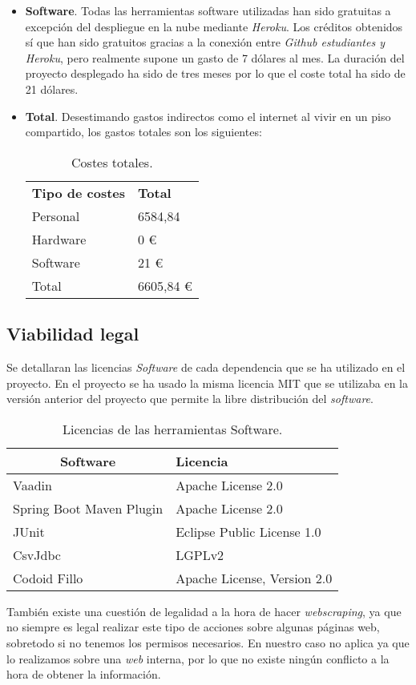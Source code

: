 \begin{itemize}
\item \textbf{Software}.
Todas las herramientas software utilizadas han sido gratuitas a excepción del despliegue en la nube mediante \emph{Heroku}. Los créditos obtenidos sí que han sido gratuitos gracias a la conexión entre \emph{Github estudiantes y Heroku}, pero realmente supone un gasto de 7 dólares al mes.
La duración del proyecto desplegado ha sido de tres meses por lo que el coste total ha sido de 21 dólares.

 
\item \textbf{Total}.
Desestimando gastos indirectos como el internet al vivir en un piso compartido, los gastos totales son los siguientes:

\begin{table}[]
	\label{Costes totales}
	\centering
	\begin{tabular}{|l|l|}
		\hline
		\multicolumn{1}{|c|}{\textbf{Tipo de costes}}     & \textbf{Total} \\
		Personal &  6584,84\\ 
		Hardware & 0 € \\
		Software & 21 € \\	\hline
		Total & 6605,84 € \\\hline
	\end{tabular}
	\caption{Costes totales.}
\end{table}

\end{itemize}

\subsection{Viabilidad legal}
Se detallaran las licencias \emph{Software} de cada dependencia que se ha utilizado en el proyecto. En el proyecto se ha usado la misma licencia MIT que se utilizaba en la versión anterior del proyecto que permite la libre distribución del \emph{software}.

\begin{table}[]
	\label{Dependencias del proyecto}
	\centering
	\begin{tabular}{|l|l|}
		\hline
		\multicolumn{1}{|c|}{\textbf{Software}}     & \textbf{Licencia} \\ \hline
		Vaadin & Apache License 2.0 \\ \hline
		Spring Boot Maven Plugin & Apache License 2.0 \\ \hline
		JUnit & Eclipse Public License 1.0 \\	\hline
		CsvJdbc & LGPLv2 \\ \hline
		Codoid Fillo & Apache License, Version 2.0 \\ \hline
	\end{tabular}
	\caption{Licencias de las herramientas Software.}
\end{table}

También existe una cuestión de legalidad a la hora de hacer \emph{webscraping}, ya que no siempre es legal realizar este tipo de acciones sobre algunas páginas web, sobretodo si no tenemos los permisos necesarios. En nuestro caso no aplica ya que lo realizamos sobre una \emph{web} interna, por lo que no existe ningún conflicto a la hora de obtener la información.

